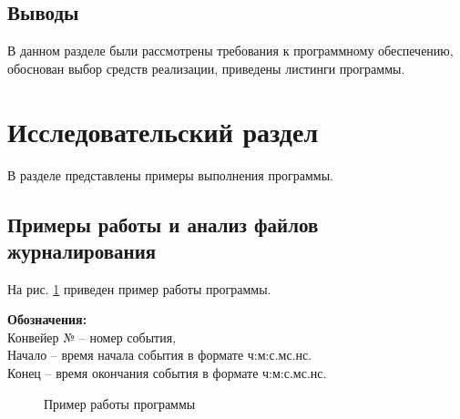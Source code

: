\documentclass[a4paper,12pt]{article}
\begin{document}
\subsection*{Выводы}

В данном разделе были рассмотрены требования к 
программному обеспечению, обоснован выбор средств 
реализации, приведены листинги программы.

\newpage

\section{Исследовательский раздел}

В разделе представлены примеры выполнения программы.

\subsection{Примеры работы и анализ файлов журналирования}

На рис. \ref{fig:t0} приведен пример работы программы.
\begin{flushleft}
	\textbf{Обозначения:}\\
	Конвейер № -- номер события,\\
	Начало -- время начала события в формате ч:м:с.мс.нс.\\
	Конец -- время окончания события в формате ч:м:с.мс.нс.
\end{flushleft}

\begin{figure}[h!]
	\caption{Пример работы программы}
	\label{fig:t0}
\end{figure}
\end{document}
